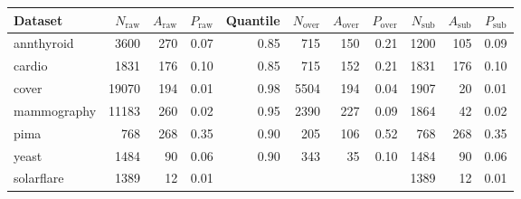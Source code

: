 \begin{tabular}{l|rrr|rrrr|rrr}
  \toprule
Dataset & $N_{\text{raw}}$ & $A_{\text{raw}}$ & $P_{\text{raw}}$ & Quantile & $N_{\text{over}}$ & $A_{\text{over}}$ & $P_{\text{over}}$ & $N_{\text{sub}}$ & $A_{\text{sub}}$ & $P_{\text{sub}}$ \\ 
  \midrule
annthyroid & 3600 & 270 & 0.07 & 0.85 & 715 & 150 & 0.21 & 1200 & 105 & 0.09 \\ 
  cardio & 1831 & 176 & 0.10 & 0.85 & 715 & 152 & 0.21 & 1831 & 176 & 0.10 \\ 
  cover & 19070 & 194 & 0.01 & 0.98 & 5504 & 194 & 0.04 & 1907 &  20 & 0.01 \\ 
  mammography & 11183 & 260 & 0.02 & 0.95 & 2390 & 227 & 0.09 & 1864 &  42 & 0.02 \\ 
  pima & 768 & 268 & 0.35 & 0.90 & 205 & 106 & 0.52 & 768 & 268 & 0.35 \\ 
  yeast & 1484 &  90 & 0.06 & 0.90 & 343 &  35 & 0.10 & 1484 &  90 & 0.06 \\ 
  solarflare & 1389 &  12 & 0.01 &  &  &  &  & 1389 &  12 & 0.01 \\ 
   \bottomrule
\end{tabular}
